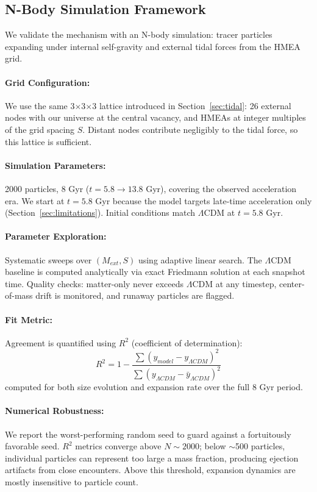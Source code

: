 \documentclass{article}
\begin{document}
\subsection{N-Body Simulation Framework}
\label{sec:framework}
We validate the mechanism with an N-body simulation: tracer particles expanding under internal self-gravity and external tidal forces from the HMEA grid.

\paragraph{Grid Configuration:}
We use the same 3$\times$3$\times$3 lattice introduced in Section~\ref{sec:tidal}: 26 external nodes with our universe at the central vacancy, and HMEAs at integer multiples of the grid spacing $S$.
Distant nodes contribute negligibly to the tidal force, so this lattice is sufficient.

\paragraph{Simulation Parameters:}
2000 particles, 8 Gyr ($t = 5.8 \rightarrow 13.8$ Gyr), covering the observed acceleration era.
We start at $t = 5.8$ Gyr because the model targets late-time acceleration only (Section~\ref{sec:limitations}).
Initial conditions match $\Lambda$CDM at $t = 5.8$ Gyr.

\paragraph{Parameter Exploration:}
Systematic sweeps over $(M_{ext}, S)$ using adaptive linear search.
The $\Lambda$CDM baseline is computed analytically via exact Friedmann solution at each snapshot time.
Quality checks: matter-only never exceeds $\Lambda$CDM at any timestep, center-of-mass drift is monitored, and runaway particles are flagged.

\paragraph{Fit Metric:}
Agreement is quantified using $R^2$ (coefficient of determination):
\[
R^2 = 1 - \frac{\sum (y_{model} - y_{\Lambda CDM})^2}{\sum (y_{\Lambda CDM} - \bar{y}_{\Lambda CDM})^2}
\]
computed for both size evolution and expansion rate over the full 8 Gyr period.

\paragraph{Numerical Robustness:}
We report the worst-performing random seed to guard against a fortuitously favorable seed.
$R^2$ metrics converge above $N \sim 2000$; below $\sim$500 particles, individual particles can represent too large a mass fraction, producing ejection artifacts from close encounters.
Above this threshold, expansion dynamics are mostly insensitive to particle count.
\end{document}
